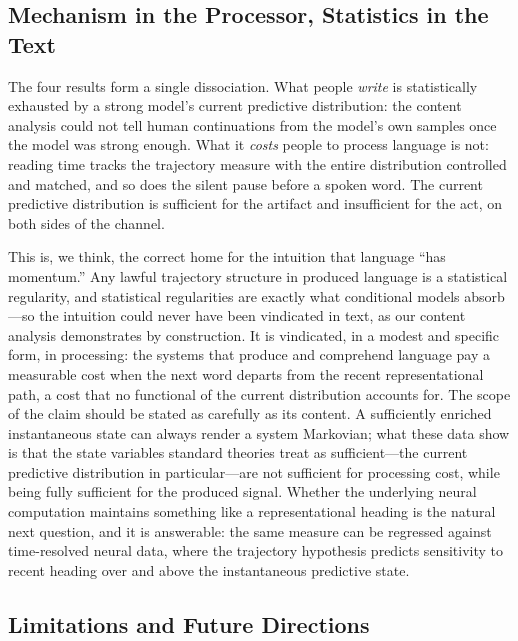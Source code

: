 \documentclass[12pt]{article}
\newcommand{\new}[1]{#1}   %
\begin{document}
\new{\subsection{Mechanism in the Processor, Statistics in the Text}

The four results form a single dissociation. What people \emph{write} is statistically exhausted by a strong model's current predictive distribution: the content analysis could not tell human continuations from the model's own samples once the model was strong enough. What it \emph{costs} people to process language is not: reading time tracks the trajectory measure with the entire distribution controlled and matched, and so does the silent pause before a spoken word. The current predictive distribution is sufficient for the artifact and insufficient for the act, on both sides of the channel.

This is, we think, the correct home for the intuition that language ``has momentum.'' Any lawful trajectory structure in produced language is a statistical regularity, and statistical regularities are exactly what conditional models absorb---so the intuition could never have been vindicated in text, as our content analysis demonstrates by construction. It is vindicated, in a modest and specific form, in processing: the systems that produce and comprehend language pay a measurable cost when the next word departs from the recent representational path, a cost that no functional of the current distribution accounts for. The scope of the claim should be stated as carefully as its content. A sufficiently enriched instantaneous state can always render a system Markovian; what these data show is that the state variables standard theories treat as sufficient---the current predictive distribution in particular---are not sufficient for processing cost, while being fully sufficient for the produced signal. Whether the underlying neural computation maintains something like a representational heading is the natural next question, and it is answerable: the same measure can be regressed against time-resolved neural data, where the trajectory hypothesis predicts sensitivity to recent heading over and above the instantaneous predictive state.}

\subsection{Limitations and Future Directions}
\end{document}
